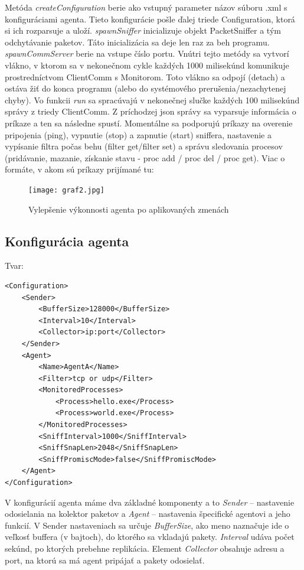 \documentclass[a4paper,12pt]{article}
\begin{document}
Metóda \textit{createConfiguration} berie ako vstupný parameter názov súboru .xml s konfiguráciami agenta. Tieto konfigurácie pošle ďalej triede Configuration, ktorá si ich rozparsuje a uloží. \textit{spawnSniffer} inicializuje objekt PacketSniffer a tým odchytávanie paketov. Táto inicializácia sa deje len raz za beh programu. \textit{spawnCommServer} berie na vstupe číslo portu. Vnútri tejto metódy sa vytvorí vlákno, v ktorom sa v nekonečnom cykle každých 1000 milisekúnd komunikuje prostredníctvom ClientComm s Monitorom. Toto vlákno sa odpojí (detach) a ostáva žiť do konca programu (alebo do systémového prerušenia/nezachytenej chyby). Vo funkcii \textit{run} sa spracúvajú v nekonečnej slučke každých 100 milisekúnd správy z triedy ClientComm. Z príchodzej json správy sa vyparsuje informácia o príkaze a ten sa následne spustí. Momentálne sa podporujú príkazy na overenie pripojenia (ping), vypnutie (stop) a zapnutie (start) sniffera, nastavenie a vypísanie filtra počas behu (filter get/filter set) a správu sledovania procesov (pridávanie, mazanie, získanie stavu - proc add / proc del / proc get). Viac o formáte, v akom sú príkazy prijímané tu: \\

\begin{figure}[t]
	\centering
	\label{graf1}
	\texttt{[image: graf2.jpg]}
	\caption{Vylepšenie výkonnosti agenta po aplikovaných zmenách}
\end{figure}
\newpage
\subsection{Konfigurácia agenta}

Tvar: \\ 
\begin{lstlisting}
<Configuration> 
	<Sender> 
		<BufferSize>128000</BufferSize> 
		<Interval>10</Interval> 
		<Collector>ip:port</Collector> 
	</Sender> 
	<Agent> 
		<Name>AgentA</Name> 
		<Filter>tcp or udp</Filter> 
		<MonitoredProcesses> 
			<Process>hello.exe</Process> 
			<Process>world.exe</Process> 
		</MonitoredProcesses> 
		<SniffInterval>1000</SniffInterval> 
		<SniffSnapLen>2048</SniffSnapLen> 
		<SniffPromiscMode>false</SniffPromiscMode> 
	</Agent> 
</Configuration> 
\end{lstlisting}

V konfigurácií agenta máme dva základné komponenty a to \textit{Sender} – nastavenie odosielania na kolektor paketov a \textit{Agent} – nastavenia špecifické agentovi a jeho funkcií.
V Sender nastaveniach sa určuje \textit{BufferSize}, ako meno naznačuje ide o veľkosť buffera (v bajtoch), do ktorého sa vkladajú pakety. \textit{Interval} udáva počet sekúnd, po ktorých prebehne replikácia. Element \textit{Collector} obsahuje adresu a port, na ktorú sa má agent pripájať a pakety odosielať. \\
\end{document}

